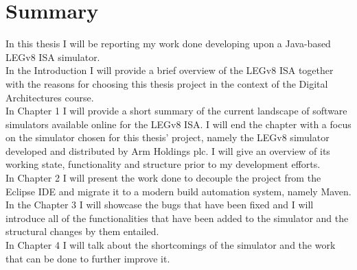 \chapter{Summary}\label{chap:summ}

In this thesis I will be reporting my work done developing upon a Java-based LEGv8 ISA simulator.
\\

In the Introduction I will provide a brief overview of the LEGv8 ISA together with the reasons for choosing this thesis project in the context of the Digital Architectures course.
\\

In Chapter 1 I will provide a short summary of the current landscape of software simulators available online for the LEGv8 ISA. I will end the chapter with a focus on the simulator chosen for this thesis' project, namely the LEGv8 simulator developed and distributed by Arm Holdings plc. I will give an overview of its working state, functionality and structure prior to my development efforts.
\\

In Chapter 2 I will present the work done to decouple the project from the Eclipse IDE and migrate it to a modern build automation system, namely Maven.
\\

In the Chapter 3 I will showcase the bugs that have been fixed and I will introduce all of the functionalities that have been added to the simulator and the structural changes by them entailed.
\\

In Chapter 4 I will talk about the shortcomings of the simulator and the work that can be done to further improve it.
